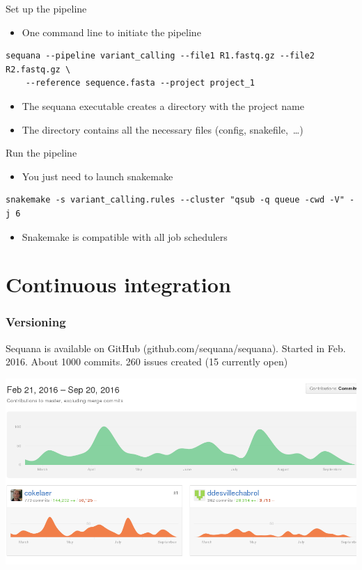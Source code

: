 \documentclass{beamer}
\begin{document}
\begin{frame}[fragile]{Set up the pipeline}
    \begin{itemize}
        \item One command line to initiate the pipeline
    \end{itemize}
    \begin{lstlisting}
sequana --pipeline variant_calling --file1 R1.fastq.gz --file2 R2.fastq.gz \
    --reference sequence.fasta --project project_1
    \end{lstlisting}
    \begin{itemize}
        \item The sequana executable creates a directory with the project name
        \item The directory contains all the necessary files (config, snakefile,~\dots)
    \end{itemize}
\end{frame}

\begin{frame}[fragile]{Run the pipeline}
    \begin{itemize}
        \item You just need to launch snakemake
    \end{itemize}
    \begin{lstlisting}
snakemake -s variant_calling.rules --cluster "qsub -q queue -cwd -V" -j 6
    \end{lstlisting}
    \begin{itemize}
        \item Snakemake is compatible with all job schedulers
    \end{itemize}
\end{frame}

\section{Continuous integration}

\begin{frame}
 \frametitle{Versioning}
Sequana is available on GitHub (github.com/sequana/sequana). Started in Feb. 2016. 
About 1000 commits. 260 issues created (15 currently open) \\
\begin{center}
\includegraphics[scale=0.2]{images/commits}
\end{center}

\end{frame}
\end{document}
